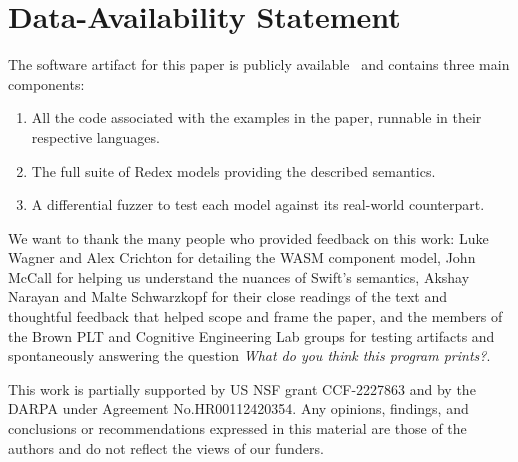 \documentclass[acmsmall]{acmart}\settopmatter{}
\begin{document}


\maketitle















\newpage

\section*{Data-Availability Statement}

The software artifact for this paper is publicly available~\cite{zenodo:artifact} and contains three main components:
\begin{enumerate}

  \item All the code associated with the examples in the paper,
    runnable in their respective languages.

  \item The full suite of Redex models providing the described
    semantics.

  \item A differential fuzzer to test each model against its real-world counterpart.

  \end{enumerate}

\begin{acks}
  We want to thank the many people who provided feedback on this work: Luke Wagner and Alex Crichton for detailing the WASM component model, John McCall for helping us understand the nuances of Swift's semantics, Akshay Narayan and Malte Schwarzkopf for their close readings of the text and thoughtful feedback that helped scope and frame the paper, and the members of the Brown PLT and Cognitive Engineering Lab groups for testing artifacts and spontaneously answering the question \emph{What do you think this program prints?}.

  This work is partially supported by US NSF grant CCF-2227863 and by the DARPA under Agreement No.\@ HR00112420354. Any opinions, findings, and conclusions or recommendations expressed in this material are those of the authors and do not reflect the views of our funders.
\end{acks}
\end{document}
